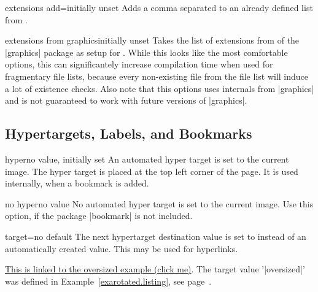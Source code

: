 \documentclass[a4paper,11pt]{ltxdoc}
\begin{document}
\begin{docIgrKey}[][doc new=2021-10-16]{extensions add}{=}{initially unset}
  Adds a comma separated  to an already defined list from
  .
\end{docIgrKey}


\begin{docIgrKey}[][doc new=2021-10-16]{extensions from graphics}{}{initially unset}
  Takes the list of extensions from 
  of the |graphics| \cite{carlisle:graphics} package as setup for .
  While this looks like the most comfortable options, this can significantely
  increase compilation time when used for fragmentary file lists, because
  every non-existing file from the file list will induce a lot of existence checks.
  Also note that this options uses internals from |graphics| and is not
  guaranteed to work with future versions of |graphics|.
\end{docIgrKey}


\clearpage
\subsection{Hypertargets, Labels, and Bookmarks}

\begin{docIgrKey}{hyper}{}{no value, initially set}
  An automated hyper target is set to the current image. The hyper target is placed
  at the top left corner of the page. It is used internally, when a bookmark is added.
\end{docIgrKey}

\begin{docIgrKey}{no hyper}{}{no value}
  No automated hyper target is set to the current image. Use this option, if
  the package |bookmark| is not included.
\end{docIgrKey}

\begin{docIgrKey}{target}{=}{no default}
  The next hypertarget destination value is set to  instead of
  an automatically created value. This may be used for hyperlinks.
\begin{dispExample}
\hyperlink{oversized}{This is linked to the oversized example (click me)}.
The target value '|oversized|' was defined in Example~\ref{exarotated.listing},
see page~\pageref{exarotated.listing}.
\end{dispExample}
\end{docIgrKey}
\end{document}
